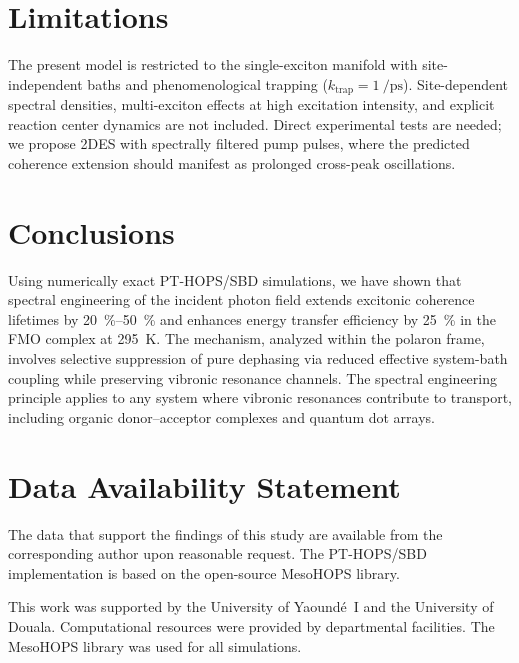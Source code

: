 \documentclass[aip,jcp,preprint]{revtex4-2}
\begin{document}
\section{\label{sec:limitations}Limitations}
The present model is restricted to the single-exciton manifold with site-independent baths and phenomenological trapping ($k_{\mathrm{trap}} = \SI{1}{\per\pico\second}$). Site-dependent spectral densities, multi-exciton effects at high excitation intensity, and explicit reaction center dynamics are not included. Direct experimental tests are needed; we propose 2DES with spectrally filtered pump pulses, where the predicted coherence extension should manifest as prolonged cross-peak oscillations.

\section{\label{sec:conclusion}Conclusions}
Using numerically exact PT-HOPS/SBD simulations, we have shown that spectral engineering of the incident photon field extends excitonic coherence lifetimes by \SIrange{20}{50}{\percent} and enhances energy transfer efficiency by \SI{25}{\percent} in the FMO complex at \SI{295}{\kelvin}. The mechanism, analyzed within the polaron frame, involves selective suppression of pure dephasing via reduced effective system-bath coupling while preserving vibronic resonance channels. The spectral engineering principle applies to any system where vibronic resonances contribute to transport, including organic donor--acceptor complexes and quantum dot arrays.

\section*{Data Availability Statement}
The data that support the findings of this study are available from the corresponding author upon reasonable request. The PT-HOPS/SBD implementation is based on the open-source MesoHOPS library.

\begin{acknowledgments}
This work was supported by the University of Yaoundé~I and the University of Douala. Computational resources were provided by departmental facilities. The MesoHOPS library was used for all simulations.
\end{acknowledgments}


\end{document}
